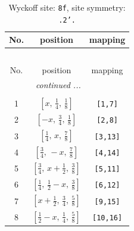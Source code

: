 \documentclass[fleqn,8pt]{jsarticle}
\begin{document}
\begin{longtable}{ccc}
\caption{Wyckoff site: {\tt 8f}, site symmetry: {\tt .2'.}}
 \\
 \hline \hline
No. & position & mapping \\ \hline \endfirsthead

\multicolumn{2}{l}{\tablename\ \thetable{}} \\
 \hline \hline
No. & position & mapping \\ \hline \endhead

 \hline \hline
\multicolumn{2}{r}{\footnotesize\it continued ...} \\ \endfoot

 \hline \hline
\multicolumn{2}{r}{} \\ \endlastfoot

1 & $\left[ x,\, \frac{1}{4},\, \frac{1}{8} \right]$ & {\tt [1,7]} \\ \hline
2 & $\left[ - x,\, \frac{3}{4},\, \frac{1}{8} \right]$ & {\tt [2,8]} \\ \hline
3 & $\left[ \frac{1}{4},\, x,\, \frac{7}{8} \right]$ & {\tt [3,13]} \\ \hline
4 & $\left[ \frac{3}{4},\, - x,\, \frac{7}{8} \right]$ & {\tt [4,14]} \\ \hline
5 & $\left[ \frac{3}{4},\, x + \frac{1}{2},\, \frac{3}{8} \right]$ & {\tt [5,11]} \\ \hline
6 & $\left[ \frac{1}{4},\, \frac{1}{2} - x,\, \frac{3}{8} \right]$ & {\tt [6,12]} \\ \hline
7 & $\left[ x + \frac{1}{2},\, \frac{3}{4},\, \frac{5}{8} \right]$ & {\tt [9,15]} \\ \hline
8 & $\left[ \frac{1}{2} - x,\, \frac{1}{4},\, \frac{5}{8} \right]$ & {\tt [10,16]} \\
\end{longtable}
\renewcommand{\arraystretch}{1.2}
\end{document}
